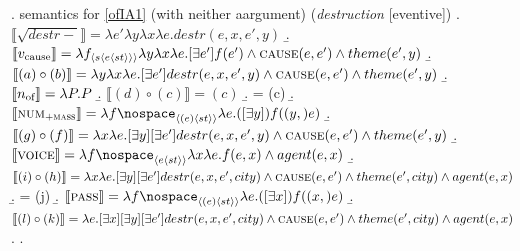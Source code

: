 \documentclass[12pt]{article}
\newcommand*{\textsub}[1]{\ensuremath{_\textrm{{\scriptsize #1}}}}
\begin{document}
\ex. \label{ofIAsem2} semantics for \ref{ofIA1} (with neither aargument) (\textit{destruction} [eventive])
\a. \begin{math}\llbracket\sqrt{destr-}\rrbracket = \lambda e' \lambda y \lambda x \lambda e . destr(e,x,e',y)\end{math}
\b. \begin{math}\llbracket v\textsub{cause}\rrbracket = \lambda f_{\langle s\langle e \langle st \rangle \rangle \rangle} \lambda y \lambda x \lambda e . [\exists e']f(e') \land \textsc{cause}(e,e') \land theme(e',y)\end{math}
\b. \begin{math}\llbracket (a) \circ (b) \rrbracket = \lambda y \lambda x \lambda e . [\exists e'] destr(e,x,e',y) \land \textsc{cause}(e,e') \land theme(e',y) \end{math}
\b. \begin{math} \llbracket n\textsub{of} \rrbracket = \lambda P.P \end{math}
\b. \begin{math}\llbracket (d) \circ (c) \rrbracket = (c)\end{math}
\b. = (c)
\b. \begin{math}\llbracket \textsc{num}\textsub{\textsc{+mass}} \rrbracket =\lambda f\nospace_{\langle (e) \langle st \rangle \rangle}\lambda e . ([\exists y]) f((y,)e) \end{math}
\b. \begin{math}\llbracket (g) \circ (f) \rrbracket = \lambda x \lambda e . [\exists y][\exists e'] destr(e,x,e',y) \land \textsc{cause}(e,e') \land theme(e',y) \end{math}
\b. \begin{math} \llbracket \textsc{voice} \rrbracket = \lambda f \nospace_{\langle e \langle st \rangle \rangle } \lambda x \lambda e . f(e,x) \land agent(e,x) \end{math}
\b. \begin{math}\llbracket (i) \circ (h) \rrbracket = \lambda x \lambda e . [\exists y][\exists e'] destr(e,x,e',city) \land \textsc{cause}(e,e') \land theme(e',city) \land agent(e,x) \end{math}
\b. = (j)
\b. \begin{math}\llbracket \textsc{pass} \rrbracket = \lambda f\nospace_{\langle (e) \langle st \rangle \rangle}\lambda e . ([\exists x]) f((x,)e) \end{math}
\b. \begin{math}\llbracket (l) \circ (k) \rrbracket = \lambda e . [\exists x][\exists y][\exists e'] destr(e,x,e',city) \land \textsc{cause}(e,e') \land theme(e',city) \land agent(e,x) \end{math}
\z. \z. \par
\end{document}
